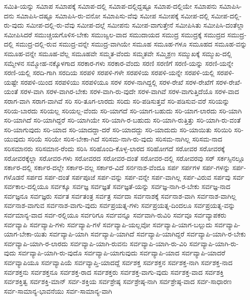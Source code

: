 {ಸಮಿತಿ-ಯನ್ನು
ಸಮಿಾಪ
ಸಮಿಾಪಕ್ಕೆ
ಸಮಿಾಪ-ದಲ್ಲಿ
ಸಮಿಾಪ-ದಲ್ಲಿದ್ದಷ್ಟೂ
ಸಮಿಾಪ-ದಲ್ಲಿಯೇ
ಸಮಿಾಪನು
ಸಮಿಾಪಿಸಿ-ದನು
ಸಮಿಾಪಿಸಿ-ದಷ್ಟೂ
ಸಮಿಾಪಿಸಿ-ರು-ವನೋ
ಸಮಿಾಪಿಸು-ವೆವು
ಸಮೀಪ
ಸಮೀಪಕ್ಕೆ
ಸಮೀಪ-ದಲ್ಲಿ
ಸಮೀಪ-ದಲ್ಲಿ-ರು-ವುದು
ಸಮೀಪ-ದಲ್ಲಿ-ರು-ವೆವು
ಸಮೀಪ-ದಲ್ಲೆ
ಸಮೀಪನು
ಸಮೀಪ-ವಾಗುತ್ತೇನೆ
ಸಮೀಪಿಸಿತು
ಸಮೀಪಿಸಿ-ದಂತೆಲ್ಲಾ
ಸಮೀಪಿಸಿದರೆ
ಸಮುಚ್ಚಯಗೊಳಿಸ-ಬೇಕು
ಸಮುಜ್ವಲ-ವಾದ
ಸಮುದಾಯದ
ಸಮುದ್ರ
ಸಮುದ್ರಕ್ಕೆ
ಸಮುದ್ರದ
ಸಮುದ್ರ-ದಲ್ಲಿ
ಸಮುದ್ರ-ದಲ್ಲಿ-ರುವ
ಸಮುದ್ರ-ವನ್ನೇ
ಸಮುದ್ರ-ವಾಗಿಯೇ
ಸಮೂಹ
ಸಮೂಹ-ಗಳೂ
ಸಮೂಹದ
ಸಮೂಹ-ವನ್ನು
ಸಮೂಹ-ವನ್ನೇ
ಸಮೂಹ-ವೆಲ್ಲ
ಸಮೂಹವೇ
ಸಮ್ಮತ-ವೆಂದು
ಸಮ್ಮತವೇ
ಸಮ್ಮಿಶ್ರಣ
ಸಮ್ಮುಖಕ್ಕೆ
ಸಮ್ಮುಖ-ದಲ್ಲಿ
ಸಮ್ಮೇಳನ
ಸಮ್ಮೋಹ-ನಕ್ಕೊಳಗಾದ
ಸರಕಾರ-ಗಳು
ಸರಕಾರ-ವೆಂದು
ಸರಣಿ
ಸರಣಿಗೆ
ಸರಣಿ-ಯನ್ನು
ಸರಣಿ-ಯನ್ನೇ
ಸರಣಿ-ಯಲ್ಲಿ
ಸರದಿ-ಗಾಗಿ
ಸರದಿಯ
ಸರಪಳಿ
ಸರಪಳಿ-ಗಳೇ
ಸರಪಳಿಯ
ಸರಪಳಿ-ಯನ್ನೇ
ಸರಪಳಿ-ಯಲ್ಲಿ
ಸರಪಳಿ-ಯಷ್ಟೇ
ಸರಪಳಿ-ಯಿಂದ
ಸರಪಳಿಯು
ಸರಪಳಿಯೂ
ಸರಳ
ಸರಳ-ನಾಗಿದ್ದಲ್ಲಿ
ಸರಳ-ರೇಖೆ
ಸರಳ-ರೇಖೆಗೆ
ಸರಳ-ರೇಖೆ-ಯಂತೆ
ಸರಳ-ವಾಗಿ
ಸರಳ-ವಾಗಿರ-ಬೇಕು
ಸರಳ-ವಾಗಿ-ರು-ವುದೇ
ಸರಳ-ವಾಗಿವೆ
ಸರಳ-ವಾಗುತ್ತಿದೆಯೊ
ಸರಳ-ವಾದ
ಸರಾಗ-ವಾಗಿ
ಸರಾಗ-ವಾಗಿವೆ
ಸರಿ
ಸರಿ-ತೂಗ-ಲಾರದು
ಸರಿದು
ಸರಿ-ಪಡಿಸುತ್ತವೆ
ಸರಿ-ಪಡಿಸುವ-ವರೆ
ಸರಿಯನ್ನು
ಸರಿಯ-ಬಾರದು
ಸರಿಯಲ್ಲ
ಸರಿಯಲ್ಲ-ವೆಂದು
ಸರಿ-ಯಾಗದೆ
ಸರಿ-ಯಾಗ-ಬಹುದು
ಸರಿ-ಯಾಗ-ಲಾರದು
ಸರಿ-ಯಾಗಿ
ಸರಿ-ಯಾಗಿದೆ
ಸರಿ-ಯಾಗಿದ್ದರೆ
ಸರಿ-ಯಾಗಿಯೇ
ಸರಿ-ಯಾಗಿ-ರ-ಬಹುದು
ಸರಿ-ಯಾಗಿ-ರುತ್ತಿತ್ತು
ಸರಿ-ಯಾಗಿ-ರು-ವಂತೆ
ಸರಿ-ಯಾಗುವುದು
ಸರಿ-ಯಾದ
ಸರಿ-ಯಾದದ್ದಾ-ದರೆ
ಸರಿ-ಯಾದದ್ದು
ಸರಿ-ಯಾದುದು
ಸರಿ-ಯಾಯಿತು
ಸರಿಯಿರಿ
ಸರಿ-ಯುವುದು
ಸರಿಯೆ
ಸರಿಯೇ
ಸರಿಸ-ಬೇಕಾ-ಗಿದೆ
ಸರಿಸಮ-ನಾಗಿ-ರು-ವುದು
ಸರಿಸಮ-ನಾಗಿಲ್ಲ
ಸರಿಸಮ-ನಾದ
ಸರಿಸಮಾನರು
ಸರಿಸಮಾನ-ರೆಂದು
ಸರಿಸಿ
ಸರಿಹೊಂದಿ-ಕೊಳ್ಳ-ಲಾರದ
ಸರಿಹೋಗದೆ
ಸರೋವರ
ಸರೋವರಕ್ಕೆ
ಸರೋವರಕ್ಕೆಲ್ಲಾ
ಸರೋವರ-ಗಳು
ಸರೋವರದ
ಸರೋವರ-ದಂತೆ
ಸರೋವರ-ದಲ್ಲಿ
ಸರೋವರವು
ಸರ್
ಸರ್ಕಸ್ಸಿನಲ್ಲೂ
ಸರ್ಕಾರ-ದಲ್ಲಿ
ಸರ್ಕಾರ-ದಲ್ಲೇ
ಸರ್ಕಾರ-ವಲ್ಲ
ಸರ್ಕಾರ-ವಿದೆ
ಸರ್ನನಾಶ-ವೆಂದೂ
ಸರ್ಪ
ಸರ್ಪಗಳ
ಸರ್ಪ-ಗಳನ್ನು
ಸರ್ಪ-ಗಳೊಡನೆ
ಸರ್ಪದ
ಸರ್ಪ-ದಂತೆ
ಸರ್ಪಪೂಜೆ
ಸರ್ಪ-ವನ್ನು
ಸರ್ಪ-ವನ್ನೇ
ಸರ್ಪ-ವಾಗಿಲ್ಲ
ಸರ್ಪ-ವಿರುವ
ಸರ್ಪವು
ಸರ್ವ
ಸರ್ವಕಾಲ-ದಲ್ಲಿಯೂ
ಸರ್ವಕ್ಕೂ
ಸರ್ವಜ್ಞ
ಸರ್ವಜ್ಞತೆ
ಸರ್ವಜ್ಞತೆ-ಯನ್ನು
ಸರ್ವಜ್ಞ-ನಾಗಿ-ರ-ಬೇಕು
ಸರ್ವಜ್ಞ-ನಾದ
ಸರ್ವಜ್ಞನೂ
ಸರ್ವಜ್ಞರು
ಸರ್ವತ
ಸರ್ವತಂತ್ರ
ಸರ್ವತ್ರ
ಸರ್ವದಾ
ಸರ್ವನಾಶಕ್ಕೆ
ಸರ್ವನಾಶ-ವಾಗಿ
ಸರ್ವನಾಶ-ವಾಗಿಲ್ಲ
ಸರ್ವನಾಶ-ವಾಗುವ
ಸರ್ವನಾಶ-ವಾಗು-ವುದು
ಸರ್ವಪ್ರಯತ್ನ-ಗಳು
ಸರ್ವಪ್ರಯತ್ನ-ದಿಂದಲೂ
ಸರ್ವಪ್ರಯತ್ನ-ವನ್ನು
ಸರ್ವಮಾನ್ಯ-ವಾದ
ಸರ್ವ-ರಲ್ಲಿಯೂ
ಸರ್ವರಿಗೂ
ಸರ್ವವನ್ನೂ
ಸರ್ವವಾಗಿ-ರುವಿರಿ
ಸರ್ವವೂ
ಸರ್ವವ್ಯಾಪಕರು
ಸರ್ವವ್ಯಾಪಿ
ಸರ್ವವ್ಯಾಪಿ-ಗಳು
ಸರ್ವವ್ಯಾಪಿ-ಗಳೆ
ಸರ್ವವ್ಯಾಪಿ-ಯಲ್ಲವೋ
ಸರ್ವವ್ಯಾಪಿ-ಯಾಗ-ಬಲ್ಲುದು
ಸರ್ವವ್ಯಾಪಿ-ಯಾಗ-ಬೇಕಾ-ಯಿತು
ಸರ್ವವ್ಯಾಪಿ-ಯಾಗಿ
ಸರ್ವವ್ಯಾಪಿ-ಯಾಗಿದೆ
ಸರ್ವವ್ಯಾಪಿ-ಯಾಗಿದ್ದರೆ
ಸರ್ವವ್ಯಾಪಿ-ಯಾಗಿ-ರ-ಬೇಕು
ಸರ್ವವ್ಯಾಪಿ-ಯಾಗಿ-ರ-ಲಾರದು
ಸರ್ವವ್ಯಾಪಿ-ಯಾಗಿ-ರುವನು
ಸರ್ವವ್ಯಾಪಿ-ಯಾಗಿ-ರು-ವಿರಿ
ಸರ್ವವ್ಯಾಪಿ-ಯಾಗಿ-ರು-ವುದು
ಸರ್ವವ್ಯಾಪಿ-ಯಾಗಿ-ರು-ವುದೊ
ಸರ್ವವ್ಯಾಪಿ-ಯಾಗುವುದು
ಸರ್ವವ್ಯಾಪಿ-ಯಾದ
ಸರ್ವವ್ಯಾಪಿ-ಯಾದರೆ
ಸರ್ವವ್ಯಾಪಿಯೂ
ಸರ್ವವ್ಯಾಪಿಯೆ
ಸರ್ವವ್ಯಾಪ್ತಿ-ಯಾದದ್ದೆ
ಸರ್ವಶಕ್ತ
ಸರ್ವಶಕ್ತನ
ಸರ್ವಶಕ್ತ-ನಾಗಿ
ಸರ್ವಶಕ್ತ-ನಾದ
ಸರ್ವಶಕ್ತನು
ಸರ್ವಶಕ್ತನೂ
ಸರ್ವಶಕ್ತ-ರಾದ
ಸರ್ವಶಕ್ತರು
ಸರ್ವಶಕ್ತ-ವಾಗು-ವುದು
ಸರ್ವಶಕ್ತ-ವಾದ
ಸರ್ವಶಕ್ತಿ
ಸರ್ವಶಕ್ತಿತ್ವ
ಸರ್ವಶಕ್ತಿ-ಮಾನ್
ಸರ್ವ-ಶಕ್ತಿಯ
ಸರ್ವಶ್ರೇಷ್ಠ
ಸರ್ವಶ್ರೇಷ್ಠ-ನಾಗಿ
ಸರ್ವಶ್ರೇಷ್ಠ-ವಾದ
ಸರ್ವ-ಸಾಧಾರಣ
ಸರ್ವ-ಸಾಮಾನ್ಯ-ಭಾವನೆಯು
ಸರ್ವ-ಸಾಮಾನ್ಯ-ವಾಗಿ
}
